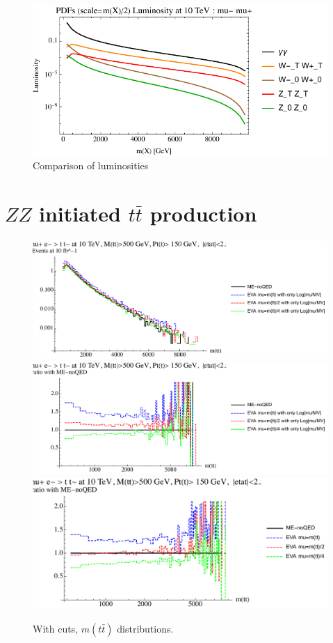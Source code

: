 \documentclass[a4paper,11pt]{article}
\begin{document}
\begin{figure}
\includegraphics[width=0.9\linewidth]{Notebooks/PlotLumi/10TeV/lumis/plotgammaWZ.pdf} 
\caption{Comparison of luminosities \label{fig:lumicomparison}}
\end{figure}

 
\clearpage

\section{$ZZ$ initiated $t \bar t$ production}

\begin{figure}[!t]
\includegraphics[width=0.46\linewidth]{Notebooks/PlotDistr/ZZ_tt/10TeVcuts/plotmtt.pdf}
\includegraphics[width=0.46\linewidth]{Notebooks/PlotDistr/ZZ_tt/10TeVcuts/plotmttratio1.pdf}
\includegraphics[width=0.46\linewidth]{Notebooks/PlotDistr/ZZ_tt/10TeVcuts/plotmttratio2.pdf}
\caption{With cuts, $m(t \bar t)$ distributions. \label{fig:cutsZZtt}}
\end{figure}
\end{document}
